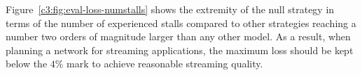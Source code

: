 Figure~\ref{c3:fig:eval-loss-numstalls} shows the extremity of the null strategy in terms of the number of experienced stalls compared to other strategies reaching a number two orders of magnitude larger than any other model. As a result, when planning a network for streaming applications, the maximum loss should be kept below the $4\%$ mark to achieve reasonable streaming quality. 








